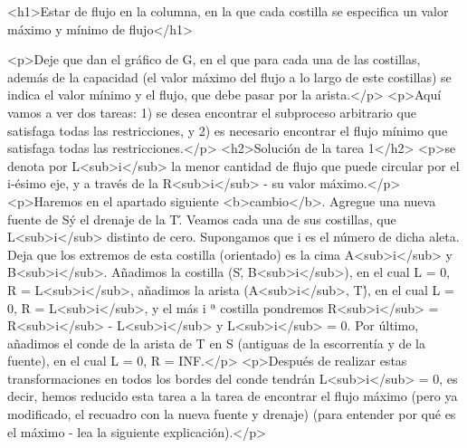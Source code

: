 <h1>Estar de flujo en la columna, en la que cada costilla se especifica un valor máximo y mínimo de flujo</h1>

<p>Deje que dan el gráfico de G, en el que para cada una de las costillas, además de la capacidad (el valor máximo del flujo a lo largo de este costillas) se indica el valor mínimo y el flujo, que debe pasar por la arista.</p>
<p>Aquí vamos a ver dos tareas: 1) se desea encontrar el subproceso arbitrario que satisfaga todas las restricciones, y 2) es necesario encontrar el flujo mínimo que satisfaga todas las restricciones.</p>
<h2>Solución de la tarea 1</h2>
<p>se denota por L<sub>i</sub> la menor cantidad de flujo que puede circular por el i-ésimo eje, y a través de la R<sub>i</sub> - su valor máximo.</p>
<p>Haremos en el apartado siguiente <b>cambio</b>. Agregue una nueva fuente de S\' y el drenaje de la T\'. Veamos cada una de sus costillas, que L<sub>i</sub> distinto de cero. Supongamos que i es el número de dicha aleta. Deja que los extremos de esta costilla (orientado) es la cima A<sub>i</sub> y B<sub>i</sub>. Añadimos la costilla (S\', B<sub>i</sub>), en el cual L = 0, R = L<sub>i</sub>, añadimos la arista (A<sub>i</sub>, T\'), en el cual L = 0, R = L<sub>i</sub>, y el más i ª costilla pondremos R<sub>i</sub> = R<sub>i</sub> - L<sub>i</sub> y L<sub>i</sub> = 0. Por último, añadimos el conde de la arista de T en S (antiguas de la escorrentía y de la fuente), en el cual L = 0, R = INF.</p>
<p>Después de realizar estas transformaciones en todos los bordes del conde tendrán L<sub>i</sub> = 0, es decir, hemos reducido esta tarea a la tarea de encontrar el flujo máximo (pero ya modificado, el recuadro con la nueva fuente y drenaje) (para entender por qué es el máximo - lea la siguiente explicación).</p>
